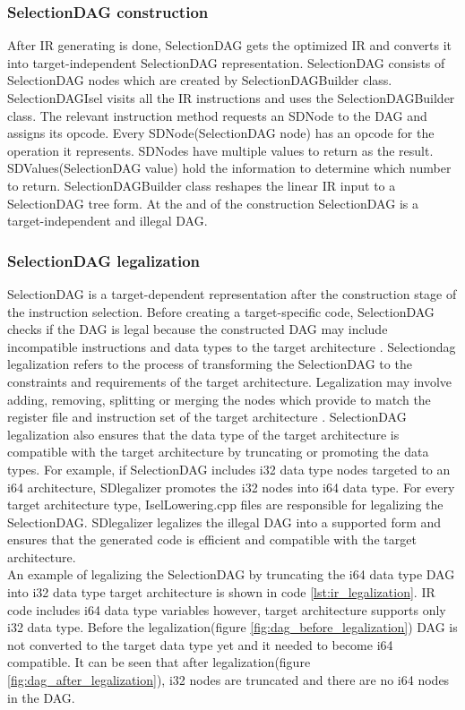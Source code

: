 \subsubsection{SelectionDAG construction}
After IR generating is done, SelectionDAG gets the optimized IR and converts it into target-independent SelectionDAG representation. SelectionDAG consists of SelectionDAG nodes which are created by SelectionDAGBuilder class. SelectionDAGIsel visits all the IR instructions and uses the SelectionDAGBuilder class. The relevant instruction method requests an SDNode to the DAG and assigns its opcode. Every SDNode(SelectionDAG node) has an opcode for the operation it represents. SDNodes have multiple values to return as the result. SDValues(SelectionDAG value) hold the information to determine which number to return. SelectionDAGBuilder class reshapes the linear IR input to a SelectionDAG tree form. At the and of the construction SelectionDAG is a target-independent and illegal DAG.

\subsubsection{SelectionDAG legalization}
SelectionDAG is a target-dependent representation after the construction stage of the instruction selection. Before creating a target-specific code, SelectionDAG checks if the DAG is legal because the constructed DAG may include incompatible instructions and data types to the target architecture \cite{legalizer}. Selectiondag legalization refers to the process of transforming the SelectionDAG to the constraints and requirements of the target architecture. Legalization may involve adding, removing, splitting or merging the nodes which provide to match the register file and instruction set of the target architecture \cite{llvmcookbook}. SelectionDAG legalization also ensures that the data type of the target architecture is compatible with the target architecture by truncating or promoting the data types. For example, if SelectionDAG includes i32 data type nodes targeted to an i64 architecture, SDlegalizer promotes the i32 nodes into i64 data type. For every target architecture type, IselLowering.cpp files are responsible for legalizing the SelectionDAG. SDlegalizer legalizes the illegal DAG into a supported form and ensures that the generated code is efficient and compatible with the target architecture.\\
An example of legalizing the SelectionDAG by truncating the i64 data type DAG into i32 data type target architecture is shown in code \ref{lst:ir_legalization}. IR code includes i64 data type variables however, target architecture supports only i32 data type. Before the legalization(figure \ref{fig:dag_before_legalization}) DAG is not converted to the target data type yet and it needed to become i64 compatible. It can be seen that after legalization(figure \ref{fig:dag_after_legalization}), i32 nodes are truncated and there are no i64 nodes in the DAG.

